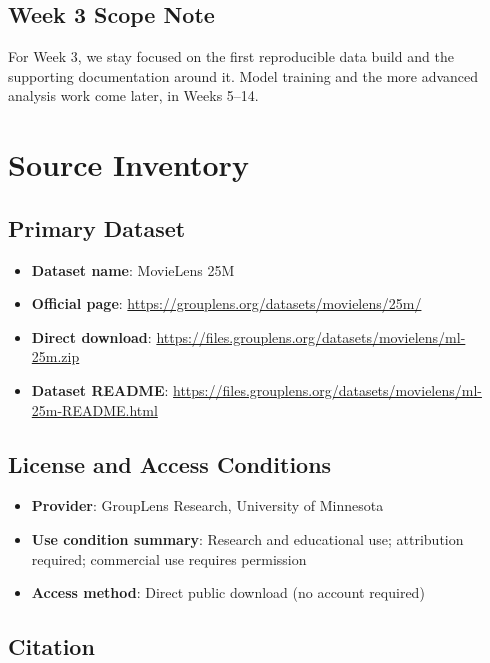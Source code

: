 \documentclass[11pt]{article}
\begin{document}
\subsection{Week 3 Scope Note}

For Week 3, we stay focused on the first reproducible data build and the supporting documentation around it. Model training and the more advanced analysis work come later, in Weeks 5--14.

\section{Source Inventory}

\subsection{Primary Dataset}

\begin{itemize}[leftmargin=1.5em]
    \item \textbf{Dataset name}: MovieLens 25M
    \item \textbf{Official page}: \url{https://grouplens.org/datasets/movielens/25m/}
    \item \textbf{Direct download}: \url{https://files.grouplens.org/datasets/movielens/ml-25m.zip}
    \item \textbf{Dataset README}: \url{https://files.grouplens.org/datasets/movielens/ml-25m-README.html}
\end{itemize}

\subsection{License and Access Conditions}

\begin{itemize}[leftmargin=1.5em]
    \item \textbf{Provider}: GroupLens Research, University of Minnesota
    \item \textbf{Use condition summary}: Research and educational use; attribution required; commercial use requires permission
    \item \textbf{Access method}: Direct public download (no account required)
\end{itemize}

\subsection{Citation}
\end{document}
